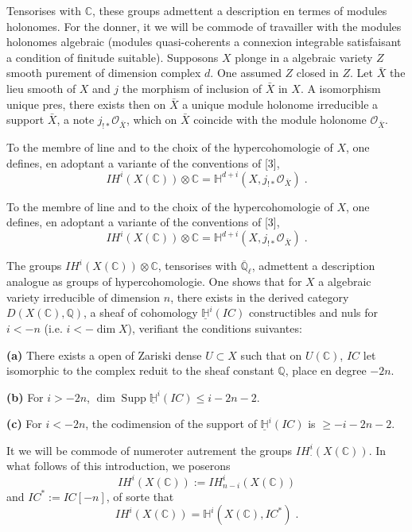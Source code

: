 \documentclass[12pt,a4paper]{article}
\theoremstyle{plain}
\theoremstyle{definition}
\theoremstyle{remark}
\DeclareMathOperator{\Supp}{Supp}
\DeclareMathOperator{\pdim}{dim}
\newcommand{\IH}{\mathit{IH}}
\newcommand{\HH}{\mathbb{H}}
\newcommand{\IC}{\mathit{IC}}
\newcommand{\CC}{\mathbb{C}}
\newcommand{\QQ}{\mathbb{Q}}
\newcommand{\cO}{\mathcal{O}}
\begin{document}
\medskip

Tensorises with $\CC$, these groups admettent a description en termes of modules holonomes. For the donner, it we will be commode of travailler with the modules holonomes algebraic (modules quasi-coherents a connexion integrable satisfaisant a condition of finitude suitable). Supposons $X$ plonge in a algebraic variety $Z$ smooth purement of dimension complex $d$. One assumed $Z$ closed in $Z$. Let $\bar{X}$ the lieu smooth of $X$ and $j$ the morphism of inclusion of $\bar{X}$ in $X$. A isomorphism unique pres, there exists then on $\bar{X}$ a unique module holonome irreducible a support $\bar{X}$, a note $j_{!*}\cO_{\bar{X}}$, which on $\bar{X}$ coincide with the module holonome $\cO_{\bar{X}}$.

\medskip

To the membre of line and to the choix of the hypercohomologie of $X$, one defines, en adoptant a variante of the conventions of [3],
\[
\IH^{i}(X(\CC)) \otimes \CC = \HH^{d+i}(X, j_{!*}\cO_{\bar{X}})\;.
\]


To the membre of line and to the choix of the hypercohomologie of $X$, one defines, en adoptant a variante of the conventions of [3],
\[
\IH^{i}(X(\CC)) \otimes \CC = \HH^{d+i}(X, j_{!*}\cO_{\bar{X}})\;.
\]

The groups $\IH^{i}(X(\CC)) \otimes \CC$, tensorises with $\overline{\QQ}_{\ell}$, admettent a description analogue as groups of hypercohomologie. One shows that for $X$ a algebraic variety irreducible of dimension $n$, there exists in the derived category $D(X(\CC), \QQ)$, a sheaf of cohomology $\underline{\HH}^{i}(\IC)$ constructibles and nuls for $i < -n$ (i.e. $i < -\pdim X$), verifiant the conditions suivantes:

\medskip

\noindent
\textbf{(a)} There exists a open of Zariski dense $U \subset X$ such that on $U(\CC)$, $\IC$ let isomorphic to the complex reduit to the sheaf constant $\QQ$, place en degree $-2n$.

\smallskip

\noindent
\textbf{(b)} For $i > -2n$, $\pdim \Supp \underline{\HH}^{i}(\IC) \leq i - 2n - 2$.

\smallskip

\noindent
\textbf{(c)} For $i < -2n$, the codimension of the support of $\underline{\HH}^{i}(\IC)$ is $\geq -i - 2n - 2$.

\medskip

It we will be commode of numeroter autrement the groups $\IH^{i}_{\cdot}(X(\CC))$. In what follows of this introduction, we poserons
\[
\IH^{i}(X(\CC)) := \IH^{i}_{n-i}(X(\CC))
\]
and $\IC^{*} := \IC[-n]$, of sorte that
\[
\IH^{i}(X(\CC)) = \HH^{i}(X(\CC), \IC^{*})\;.
\]
\end{document}
